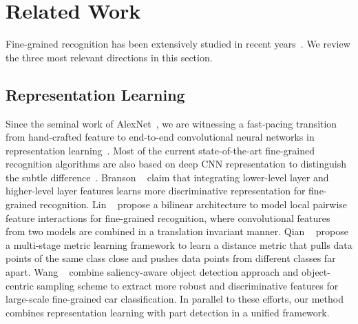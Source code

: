 \documentclass[10pt,twocolumn,letterpaper]{article}
\begin{document}

\section{Related Work}
Fine-grained recognition has been extensively studied in recent years~\cite{bossard2014food, berg2014birdsnap, cui2016fine, huang2016part, krause2015fine, krause20133d, khosla2011novel, liu2012dog, nilsback2008automated}.
We review the three most relevant directions in this section.

\subsection{Representation Learning}
Since the seminal work of AlexNet~\cite{krizhevsky2012imagenet}, we are witnessing a fast-pacing transition from hand-crafted feature to end-to-end convolutional neural networks in representation learning~\cite{simonyan2014very, szegedy2015going, he2016deep}.
Most of the current state-of-the-art fine-grained recognition algorithms are also based on deep CNN representation to distinguish the subtle difference~\cite{gao2016compact, kong2016low, lin2015bilinear}.
Branson \etal~\cite{branson2014bird} claim that integrating lower-level layer and higher-level layer features learns more discriminative representation for fine-grained recognition.
Lin \etal~\cite{lin2015bilinear} propose a bilinear architecture to model local pairwise feature interactions for fine-grained recognition, where convolutional features from two models are combined in a translation invariant manner.
Qian \etal~\cite{qian2015fine} propose a multi-stage metric learning framework to learn a distance metric that pulls data points of the same class close and pushes data points from different classes far apart.
Wang \etal~\cite{wang2014object} combine saliency-aware object detection approach and object-centric sampling scheme to extract more robust and discriminative features for large-scale fine-grained car classification.
In parallel to these efforts, our method combines representation learning with part detection in a unified framework.
\end{document}
